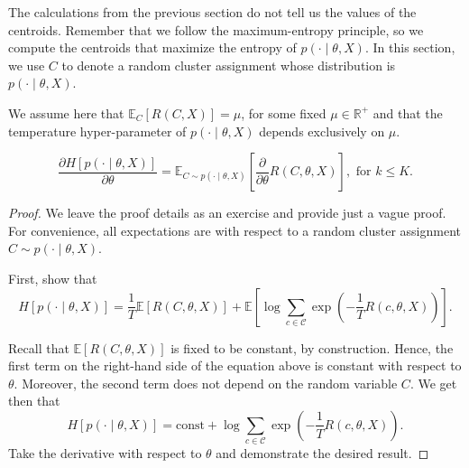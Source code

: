 The calculations from the previous section do not tell us the values of the centroids. Remember that we follow the maximum-entropy principle, so
we compute the centroids that maximize the entropy of $p(\cdot \mid \theta, X)$. In this
section, we use $C$ to denote a random cluster assignment whose distribution
is $p(\cdot \mid \theta, X)$.

We assume here that $\mathbb{E}_{C} \left[R(C, X)\right] = \mu$, for some fixed $\mu \in \mathbb{R}^+$ and that the temperature hyper-parameter
of $p(\cdot \mid \theta, X)$ depends exclusively on $\mu$.

\begin{lemma}
%
\begin{equation}
\frac{\partial H \left[p(\cdot \mid \theta, X)\right]}{\partial \theta} = \mathbb{E}_{C \sim p(\cdot \mid \theta, X)}\left[\frac{\partial}{\partial \theta}R(C, \theta, X)\right], \text{ for $k \leq K$}.
\end{equation}
%
\label{lem:stationarity_condition}
\end{lemma}

\begin{proof}
We leave the proof details as an exercise and provide just a vague
proof. For convenience, all expectations are with respect to a random cluster assignment $C \sim p(\cdot \mid \theta, X)$.

First, show that
%
\begin{equation}
H\left[p(\cdot \mid \theta, X)\right] = \frac{1}{T}\mathbb{E}\left[R(C, \theta, X)\right] + \mathbb{E}\left[\log \sum_{c \in \mathcal{C}} \exp\left(-\frac{1}{T}R(c, \theta, X)\right)\right].
\end{equation}

Recall that $\mathbb{E}\left[R(C, \theta, X)\right]$ is fixed to be constant, by construction. Hence,
the first term on the right-hand side of the equation above is constant with
respect to $\theta$. Moreover, the second term does not depend on the random variable $C$. We get then that
%
\begin{equation}
H[p(\cdot \mid \theta, X)] = \text{const} + \log \sum_{c \in \mathcal{C}} \exp\left(- \frac{1}{T}R(c, \theta, X)\right).
\end{equation}
%
Take the derivative with respect to $\theta$ and demonstrate the desired result.
%
\end{proof}

